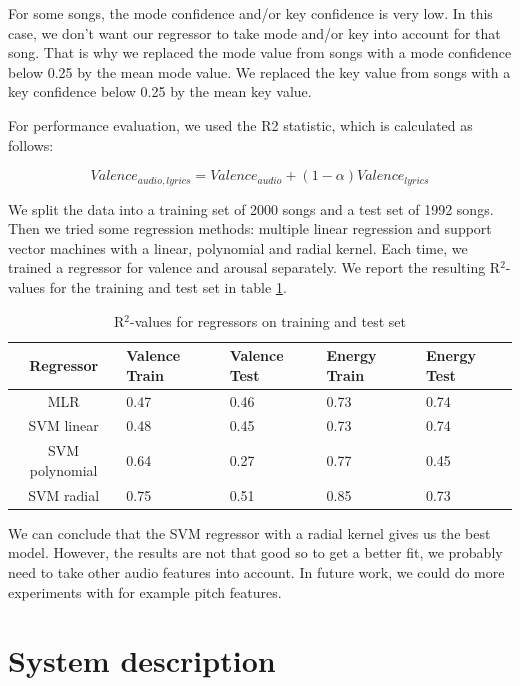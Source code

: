 \documentclass[10pt,journal,compsoc]{IEEEtran}
\begin{document}
	For some songs, the mode confidence and/or key confidence is very low. In this case, we don't want our regressor to take mode and/or key into account for that song. That is why we replaced the mode value from songs with a mode confidence below 0.25 by the mean mode value. We replaced the key value from songs with a key confidence below 0.25 by the mean key value. 
	
	For performance evaluation, we used the R2 statistic, which is calculated as follows:
	
	\begin{equation}
	Valence_{audio, lyrics} =  Valence_{audio} + (1 - \alpha)Valence_{lyrics}
	\label{eq:statistic}
	\end{equation}
	
	We split the data into a training set of 2000 songs and a test set of 1992 songs. Then we tried some regression methods: multiple linear regression and support vector machines with a linear, polynomial and radial kernel. Each time, we trained a regressor for valence and arousal separately. We report the resulting R$^{2}$-values for the training and test set in table \ref{tb:rv}.
	
	\begin{table}[]
		\centering
		\caption{R$^{2}$-values for regressors on training and test set}
		\begin{tabular}{|c|p{1.5cm} p{1.5cm} p{1.5cm} p{1cm}|}
			\hline
			Regressor & Valence Train & Valence Test & Energy Train & Energy Test \\ \hline
			MLR & 0.47 & 0.46 & 0.73 & 0.74 \\
			SVM linear & 0.48 & 0.45 & 0.73 & 0.74 \\
			SVM polynomial & 0.64 & 0.27 & 0.77 & 0.45 \\
			SVM radial & 0.75 & 0.51 & 0.85 & 0.73 \\
			\hline
		\end{tabular}
		\label{tb:rv}
	\end{table}
	
	We can conclude that the SVM regressor with a radial kernel gives us the best model. However, the results are not that good so to get a better fit, we probably need to take other audio features into account. In future work, we could do more experiments with for example pitch features.
		
	\section{System description}	
	
\end{document}
